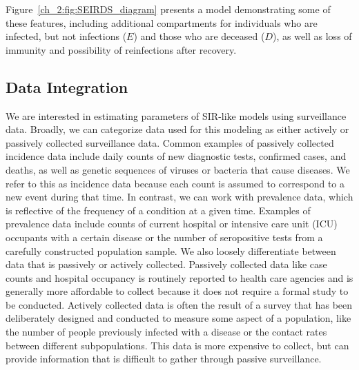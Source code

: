 Figure~\ref{ch_2:fig:SEIRDS_diagram} presents a model demonstrating some of these features, including additional compartments for individuals who are infected, but not infections (\( E \)) and those who are deceased (\( D \)), as well as loss of immunity and possibility of reinfections after recovery.

\subsection{Data Integration}
\label{ch_2:sec:data_integration}
We are interested in estimating parameters of SIR-like models using surveillance data.
Broadly, we can categorize data used for this modeling as either actively or passively collected surveillance data.
Common examples of passively collected incidence data include daily counts of new diagnostic tests, confirmed cases, and deaths, as well as genetic sequences of viruses or bacteria that cause diseases.
We refer to this as incidence data because each count is assumed to correspond to a new event during that time.
In contrast, we can work with prevalence data, which is reflective of the frequency of a condition at a given time.
Examples of prevalence data include counts of current hospital or intensive care unit (ICU) occupants with a certain disease or the number of seropositive tests from a carefully constructed population sample.
We also loosely differentiate between data that is passively or actively collected.
Passively collected data like case counts and hospital occupancy is routinely reported to health care agencies and is generally more affordable to collect because it does not require a formal study to be conducted.
Actively collected data is often the result of a survey that has been deliberately designed and conducted to measure some aspect of a population, like the number of people previously infected with a disease or the contact rates between different subpopulations.
This data is more expensive to collect, but can provide information that is difficult to gather through passive surveillance.

